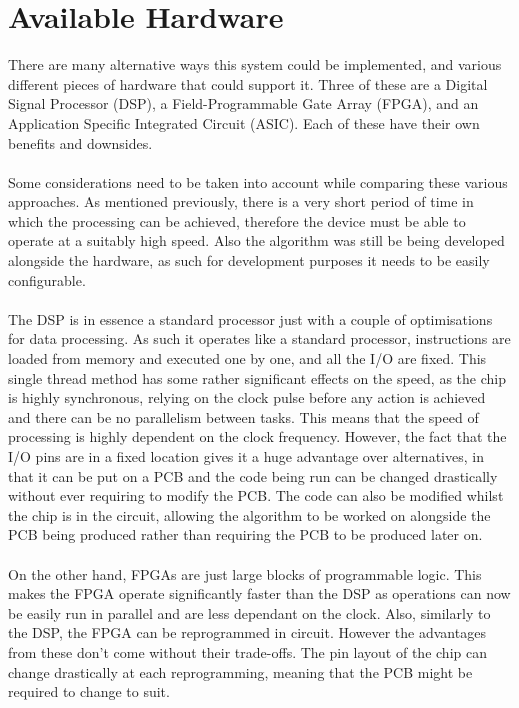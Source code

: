 \section{Available Hardware}
There are many alternative ways this system could be implemented, and various different pieces of hardware that could support it.
Three of these are a Digital Signal Processor (DSP), a Field-Programmable Gate Array (FPGA), and an Application Specific Integrated Circuit (ASIC).
Each of these have their own benefits and downsides.
\\
\\
Some considerations need to be taken into account while comparing these various approaches.
As mentioned previously, there is a very short period of time in which the processing can be achieved, therefore the device must be able to operate at a suitably high speed.
Also the algorithm was still be being developed alongside the hardware, as such for development purposes it needs to be easily configurable.
\\
\\
The DSP is in essence a standard processor just with a couple of optimisations for data processing. 
As such it operates like a standard processor, instructions are loaded from memory and executed one by one, and all the I/O are fixed.
This single thread method has some rather significant effects on the speed, as the chip is highly synchronous, relying on the clock pulse before any action is achieved and there can be no parallelism between tasks.
This means that the speed of processing is highly dependent on the clock frequency.
However, the fact that the I/O pins are in a fixed location gives it a huge advantage over alternatives, in that it can be put on a PCB and the code being run can be changed drastically without ever requiring to modify the PCB.
The code can also be modified whilst the chip is in the circuit, allowing the algorithm to be worked on alongside the PCB being produced rather than requiring the PCB to be produced later on.
\\
\\
On the other hand, FPGAs are just large blocks of programmable logic.
This makes the FPGA operate significantly faster than the DSP as operations can now be easily run in parallel and are less dependant on the clock.
Also, similarly to the DSP, the FPGA can be reprogrammed in circuit.
However the advantages from these don't come without their trade-offs.
The pin layout of the chip can change drastically at each reprogramming, meaning that the PCB might be required to change to suit.
